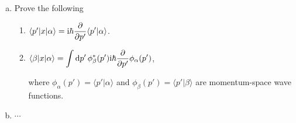\newpage
\begin{enumerate}[(a)]
	\item Prove the following
	\begin{enumerate}[label = (\roman*)]
		\item $\langle p' | x | \alpha \rangle = \mathrm{i} \hbar \displaystyle{\pdv{}{p'} }\langle p' | \alpha \rangle$.
		
		\item $\langle \beta | x | \alpha \rangle = \displaystyle{\int \dd{p'} \phi_{\beta}^{*} (p') \mathrm{i}\hbar \pdv{}{p'} \phi_{\alpha} (p')}$, 
		
		\vspace{1ex}
		
		where $\phi_{\alpha}(p') = \langle p' | \alpha \rangle$ and $\phi_{\beta}(p') = \langle p' | \beta \rangle$ are momentum-space wave functions.
	\end{enumerate}
	
	\item $\cdots$
\end{enumerate}
